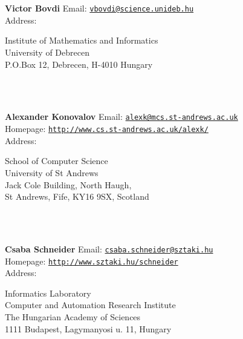 \documentclass[a4paper,11pt]{report}
\begin{document}
\begin{titlepage}
\mbox{}\\
{\mbox{}\\
\small \noindent \textbf{Victor Bovdi   }  Email: \href{mailto://vbovdi@science.unideb.hu} {\texttt{vbovdi@science.unideb.hu}}\\
  Address: \begin{minipage}[t]{8cm}\noindent
 Institute of Mathematics and Informatics\\
 University of Debrecen\\
 P.O.Box 12, Debrecen, H-4010 Hungary \end{minipage}
}\\
{\mbox{}\\
\small \noindent \textbf{Alexander Konovalov    }  Email: \href{mailto://alexk@mcs.st-andrews.ac.uk} {\texttt{alexk@mcs.st-andrews.ac.uk}}\\
  Homepage: \href{http://www.cs.st-andrews.ac.uk/~alexk/} {\texttt{http://www.cs.st-andrews.ac.uk/\texttt{}alexk/}}\\
  Address: \begin{minipage}[t]{8cm}\noindent
 School of Computer Science\\
 University of St Andrews\\
 Jack Cole Building, North Haugh,\\
 St Andrews, Fife, KY16 9SX, Scotland \end{minipage}
}\\
{\mbox{}\\
\small \noindent \textbf{ Csaba Schneider    }  Email: \href{mailto://csaba.schneider@sztaki.hu} {\texttt{csaba.schneider@sztaki.hu}}\\
  Homepage: \href{http://www.sztaki.hu/~schneider} {\texttt{http://www.sztaki.hu/\texttt{}schneider}}\\
  Address: \begin{minipage}[t]{8cm}\noindent
 Informatics Laboratory\\
 Computer and Automation Research Institute\\
 The Hungarian Academy of Sciences\\
 1111 Budapest, Lagymanyosi u. 11, Hungary \end{minipage}
}\\
\end{titlepage}
\end{document}
